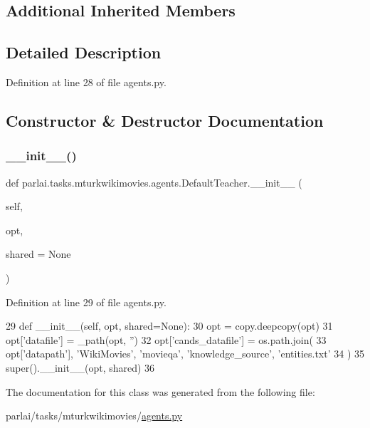 \subsection*{Additional Inherited Members}


\subsection{Detailed Description}


Definition at line 28 of file agents.\+py.



\subsection{Constructor \& Destructor Documentation}
\mbox{\label{classparlai_1_1tasks_1_1mturkwikimovies_1_1agents_1_1DefaultTeacher_ae77ddc3240f18cf49cc2c2a5c4dcfb49}} 
\subsubsection{\texorpdfstring{\+\_\+\+\_\+init\+\_\+\+\_\+()}{\_\_init\_\_()}}
{\footnotesize\ttfamily def parlai.\+tasks.\+mturkwikimovies.\+agents.\+Default\+Teacher.\+\_\+\+\_\+init\+\_\+\+\_\+ (\begin{DoxyParamCaption}\item[{}]{self,  }\item[{}]{opt,  }\item[{}]{shared = {\ttfamily None} }\end{DoxyParamCaption})}



Definition at line 29 of file agents.\+py.


\begin{DoxyCode}
29     \textcolor{keyword}{def }\_\_init\_\_(self, opt, shared=None):
30         opt = copy.deepcopy(opt)
31         opt[\textcolor{stringliteral}{'datafile'}] = \_path(opt, \textcolor{stringliteral}{''})
32         opt[\textcolor{stringliteral}{'cands\_datafile'}] = os.path.join(
33             opt[\textcolor{stringliteral}{'datapath'}], \textcolor{stringliteral}{'WikiMovies'}, \textcolor{stringliteral}{'movieqa'}, \textcolor{stringliteral}{'knowledge\_source'}, \textcolor{stringliteral}{'entities.txt'}
34         )
35         super().\_\_init\_\_(opt, shared)
36 \end{DoxyCode}


The documentation for this class was generated from the following file\+:\begin{DoxyCompactItemize}
\item 
parlai/tasks/mturkwikimovies/\hyperlink{parlai_2tasks_2mturkwikimovies_2agents_8py}{agents.\+py}\end{DoxyCompactItemize}
